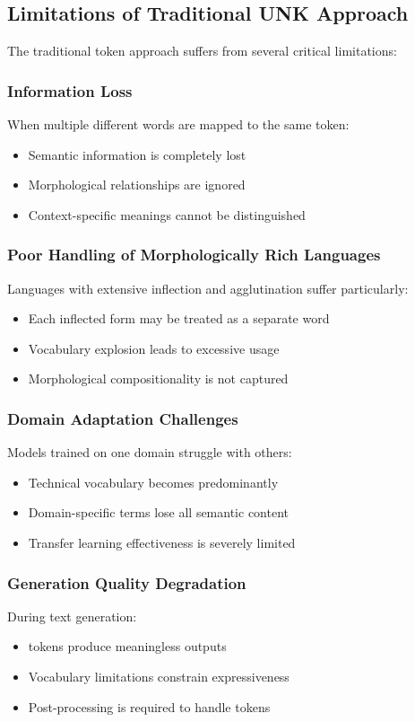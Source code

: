 \subsection{Limitations of Traditional UNK Approach}

The traditional \unk{} token approach suffers from several critical limitations:

\subsubsection{Information Loss}
When multiple different words are mapped to the same \unk{} token:
\begin{itemize}
\item Semantic information is completely lost
\item Morphological relationships are ignored
\item Context-specific meanings cannot be distinguished
\end{itemize}

\subsubsection{Poor Handling of Morphologically Rich Languages}
Languages with extensive inflection and agglutination suffer particularly:
\begin{itemize}
\item Each inflected form may be treated as a separate word
\item Vocabulary explosion leads to excessive \unk{} usage
\item Morphological compositionality is not captured
\end{itemize}

\subsubsection{Domain Adaptation Challenges}
Models trained on one domain struggle with others:
\begin{itemize}
\item Technical vocabulary becomes predominantly \unk{}
\item Domain-specific terms lose all semantic content
\item Transfer learning effectiveness is severely limited
\end{itemize}

\subsubsection{Generation Quality Degradation}
During text generation:
\begin{itemize}
\item \unk{} tokens produce meaningless outputs
\item Vocabulary limitations constrain expressiveness
\item Post-processing is required to handle \unk{} tokens
\end{itemize}

